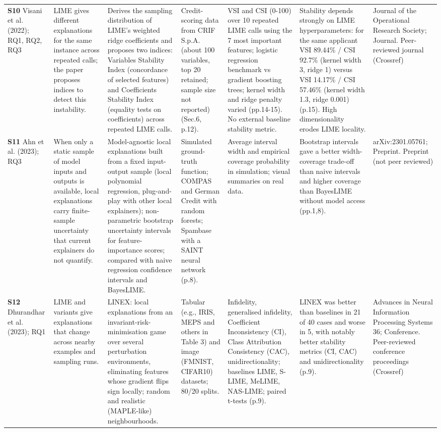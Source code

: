 \begin{longtable}{@{}P{1.55cm}P{2.9cm}P{4.5cm}P{3.2cm}P{3.4cm}P{4.6cm}P{3.6cm}@{}}
\textbf{S10} \cite{S10} Visani et al. (2022); RQ1, RQ2, RQ3 & LIME gives different explanations for the same instance across repeated calls; the paper proposes indices to detect this instability. & Derives the sampling distribution of LIME's weighted ridge coefficients and proposes two indices: Variables Stability Index (concordance of selected features) and Coefficients Stability Index (equality tests on coefficients) across repeated LIME calls. & Credit-scoring data from CRIF S.p.A. (about 100 variables, top 20 retained; sample size not reported) (Sec.6, p.12). & VSI and CSI (0-100) over 10 repeated LIME calls using the 7 most important features; logistic regression benchmark vs gradient boosting trees; kernel width and ridge penalty varied (pp.14-15). No external baseline stability metric. & Stability depends strongly on LIME hyperparameters: for the same applicant VSI 89.44\% /\allowbreak{} CSI 92.7\% (kernel width 3, ridge 1) versus VSI 14.17\% /\allowbreak{} CSI 57.46\% (kernel width 1.3, ridge 0.001) (p.15). High dimensionality erodes LIME locality. & Journal of the Operational Research Society; Journal. Peer-reviewed journal (Crossref) \\
\textbf{S11} \cite{S11} Ahn et al. (2023); RQ3 & When only a static sample of model inputs and outputs is available, local explanations carry finite-sample uncertainty that current explainers do not quantify. & Model-agnostic local explanations built from a fixed input-output sample (local polynomial regression, plug-and-play with other local explainers); non-parametric bootstrap uncertainty intervals for feature-importance scores; compared with naive regression confidence intervals and BayesLIME. & Simulated ground-truth function; COMPAS and German Credit with random forests; Spambase with a SAINT neural network (p.8). & Average interval width and empirical coverage probability in simulation; visual summaries on real data. & Bootstrap intervals gave a better width-coverage trade-off than naive intervals and higher coverage than BayesLIME without model access (pp.1,8). & arXiv:2301.05761; Preprint. Preprint (not peer reviewed) \\
\textbf{S12} \cite{S12} Dhurandhar et al. (2023); RQ1 & LIME and variants give explanations that change across nearby examples and sampling runs. & LINEX: local explanations from an invariant-risk-minimisation game over several perturbation environments, eliminating features whose gradient flips sign locally; random and realistic (MAPLE-like) neighbourhoods. & Tabular (e.g., IRIS, MEPS and others in Table 3) and image (FMNIST, CIFAR10) datasets; 80/\allowbreak{}20 splits. & Infidelity, generalised infidelity, Coefficient Inconsistency (CI), Class Attribution Consistency (CAC), unidirectionality; baselines LIME, S-LIME, MeLIME, NAS-LIME; paired t-tests (p.9). & LINEX was better than baselines in 21 of 40 cases and worse in 5, with notably better stability metrics (CI, CAC) and unidirectionality (p.9). & Advances in Neural Information Processing Systems 36; Conference. Peer-reviewed conference proceedings (Crossref) \\

\end{longtable}
